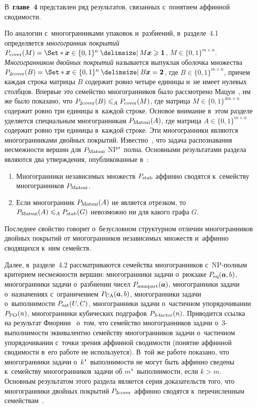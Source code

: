 
В~\textbf{главе~4} представлен ряд результатов, связанных с~понятием аффинной сводимости. 

По аналогии с~многогранниками упаковок и~разбиений, в~разделе~4.1 определяется
\emph{многогранник покрытий}
\(\Cover(M) = \Set*{\bm{x}\in\{0,1\}^n \given M \bm{x} \ge \bm{1}}\),
$M\in\{0,1\}^{m\times n}$.
\emph{Многогранником двойных покрытий} называется выпуклая оболочка множества
\(\DCP(B) =  \Set*{\bm{x}\in\{0,1\}^n \given B \bm{x} = \bm{2}}\),
где $B \in \{0,1\}^{m\times n}$, причем каждая строка матрицы $B$ содержит ровно четыре единицы и~не имеет нулевых столбцов.
Впервые это семейство многогранников было рассмотрено Мацуи~\cite{Matsui:1995},
им же было показано, что $P_{\textup{2cover}}(B) \leqslant_A P_{\textup{cover}}(M)$, где матрица $M \in \{0,1\}^{4m\times n}$ содержит ровно три единицы в~каждой строке.
Основое внимание в~этом разделе уделяется специальным многогранникам $P_{\textup{Matsui}}(A)$, где матрица $A \in \{0,1\}^{m\times n}$ содержит ровно три единицы в~каждой строке. Эти многогранники являются многогранниками двойных покрытий.
Известно~\cite{Matsui:1995}, что задача распознавания несмежности вершин для $P_{\textup{Matsui}}$ NP"~полна. Основными результатами раздела являются два утверждения, опубликованные в~:
\begin{enumerate}
	\item Многогранники независимых множеств $P_{\textup{stab}}$ аффинно сводятся к~семейству многогранников $P_{\textup{Matsui}}$.
	\item Если многогранник $P_{\textup{Matsui}}(A)$ не является отрезком, то $P_{\textup{Matsui}}(A) \leqslant_A P_{\textup{stab}}(G)$ невозможно ни для какого графа $G$.
\end{enumerate}
Последнее свойство говорит о~безусловном структурном отличии многогранников двойных покрытий от многогранников независимых множеств и~аффинно сводящихся к~ним семейств.

{\sloppy
Далее, в~разделе~4.2 рассматриваются семейства многогранников с~NP-полным критерием несмежности вершин: многогранники задачи о~рюкзаке $P_{\textup{eq}}(\bm{a},b)$, многогранники задачи о~разбиении чисел $P_{\textup{numpart}}(\bm{a})$, многогранники задачи о~назначениях с~ограничением $P_{\textup{CA}}(\bm{a},b)$, многогранники задачи о~выполнимости $P_{\textup{sat}}(U,C)$, многогранники задачи о~частичном упорядочивании $P_{\textup{PO}}(n)$, многогранники кубических подграфов $P_{\textup{3-factor}}(n)$.
Приводится ссылка на результат Фиорини~\cite{Fiorini:2003} о~том, что семейство многогранников задачи о~3-выполнимости эквивалентно семейству многогранников задачи о~частичном упорядочивании с~точки зрения аффинной сводимости (понятие аффинной сводимости в~его работе не используется). В~той же работе показано, что многогранники задачи о~$k$"~выполнимости не могут быть аффинно сведены к~семейству многогранников задачи об $m$"~выполнимости, если $k > m$.
Основным результатом этого раздела является серия доказательств того, что многогранники двойных покрытий $P_{\textup{2cover}}$ аффинно сводятся к~перечисленным семействам~.

}

